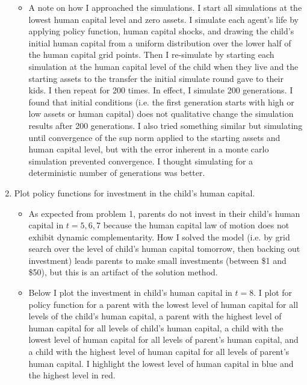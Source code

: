 \documentclass{article}
\begin{document}
\begin{enumerate}
\begin{itemize}
\item A note on how I approached the simulations. I start all simulations at the lowest human capital level and zero assets.  I simulate each agent's life by applying policy function, human capital shocks, and drawing the child's initial human capital from a uniform distribution over the lower half of the human capital grid points.  Then I re-simulate by starting each simulation at the human capital level of the child when they live and the starting assets to the transfer the initial simulate round gave to their kids. I then repeat for 200 times.  In effect, I simulate 200 generations. I found that initial conditions (i.e. the first generation starts with high or low assets or human capital) does not qualitative change the simulation results after 200 generations.  I also tried something similar but simulating until convergence of the sup norm applied to the starting assets and human capital level, but with the error inherent in a monte carlo simulation prevented convergence. I thought simulating for a deterministic number of generations was better.

\end{itemize}

\item Plot policy functions for investment in the child's human capital.

\begin{itemize}

\item As expected from problem 1, parents do not invest in their child's human capital in $t=5, 6, 7$ because the human capital law of motion does not exhibit dynamic complementarity.  How I solved the model (i.e. by grid search over the level of child's human capital tomorrow, then backing out investment) leads parents to make small investments (between \$1 and \$50), but this is an artifact of the solution method.

\item Below I plot the investment in child's human capital in $t=8$.  I plot for policy function for a parent with the lowest level of human capital for all levels of the child's human capital, a parent with the highest level of human capital for all levels of child's human capital, a child with the lowest level of human capital for all levels of parent's human capital, and a child with the highest level of human capital for all levels of parent's human capital.  I highlight the lowest level of human capital in blue and the highest level in red.


\end{itemize}
\end{enumerate}
\end{document}
